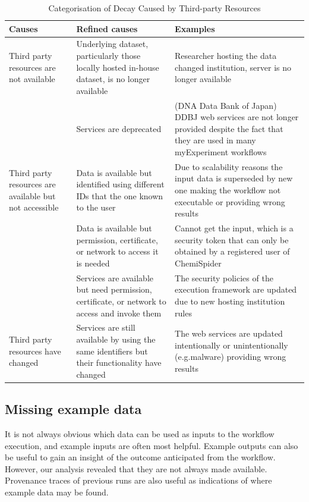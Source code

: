 \begin{table}[ht]
\caption{Categorisation of Decay Caused by Third-party Resources} %
\centering  %
\begin{tabular}{p{1.6in} p{2.2in} p{2.2in}} %
\hline\hline                        %
Causes &  Refined causes & Examples \\
\hline                  

Third party resources are not available & Underlying dataset, particularly those locally hosted in-house dataset, is no longer available & Researcher hosting the data changed institution, server is no longer available
\\ \cline{2-3}
			 									& Services are deprecated & (DNA Data Bank of Japan) DDBJ web services are not longer provided despite the fact that they are used in many myExperiment workflows
 \\ \hline

Third party resources are available but not accessible & Data is available but identified using different IDs that the one known to the user & Due to scalability reasons the input data is superseded by new one making the workflow not executable or providing wrong results
\\ \cline{2-3}

								& Data is available but permission, certificate, or network to access it is needed & Cannot get the input, which is a security token that can only be obtained by a registered user of ChemiSpider
\\ \cline{2-3}
								& Services are available but need permission, certificate, or network to access and invoke them	& The security policies of the execution framework are updated due to new hosting institution rules \\
\hline
Third party resources have changed &  Services are still available by using the same identifiers but their functionality have changed & The web services are updated intentionally or unintentionally (e.g.malware) providing wrong results \\
\hline
\end{tabular}
\label{table:decay} %
\end{table}

\subsection{Missing example data}
It is not always obvious which data can be used as inputs to the workflow execution, and example inputs are often most helpful.  Example outputs can also be useful to gain an insight of the outcome anticipated from the workflow. However, our analysis revealed that they are not always made available. Provenance traces of previous runs are also useful as indications of where example data may be found.


